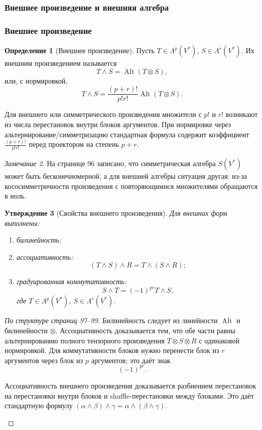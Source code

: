 \documentclass[12pt,a4paper]{article}
\theoremstyle{definition}
\newtheorem{definition}{Определение}[section]
\theoremstyle{plain}
\newtheorem{proposition}[definition]{Утверждение}
\theoremstyle{remark}
\newtheorem{remark}[definition]{Замечание}
\newenvironment{knowledgefix}{\begin{clarifybox}}{\end{clarifybox}}
\newcommand{\Alt}{\operatorname{Alt}}
\begin{document}
\subsubsection{Внешнее произведение и внешняя алгебра}

\subsubsection*{Внешнее произведение}

\begin{definition}[Внешнее произведение]
Пусть $T\in\Lambda^p(V^*)$, $S\in\Lambda^r(V^*)$. Их внешним произведением называется
\[
    T\wedge S=\Alt(T\otimes S),
\]
или, с нормировкой,
\[
    T\wedge S=\frac{(p+r)!}{p!r!}\Alt(T\otimes S).
\]
\begin{knowledgefix}
Для внешнего или симметрического произведения множители с \(p!\) и \(r!\) возникают из числа перестановок внутри блоков аргументов. При нормировке через альтернирование/симметризацию стандартная формула содержит коэффициент \(\frac{(p+r)!}{p!r!}\) перед проектором на степень \(p+r\).
\end{knowledgefix}
\end{definition}

\begin{remark}
На странице 96 записано, что симметрическая алгебра $S(V^*)$ может быть бесконечномерной, а для внешней алгебры ситуация другая: из-за кососимметричности произведения с повторяющимися множителями обращаются в ноль.
\end{remark}

\begin{proposition}[Свойства внешнего произведения]
Для внешних форм выполнены:
\begin{enumerate}[label=\arabic*)]
    \item билинейность;
    \item ассоциативность:
    \[
        (T\wedge S)\wedge R=T\wedge(S\wedge R);
    \]
    \item градуированная коммутативность:
    \[
        S\wedge T=(-1)^{pr}T\wedge S,
    \]
    где $T\in\Lambda^p(V^*)$, $S\in\Lambda^r(V^*)$.
\end{enumerate}
\end{proposition}

\begin{proof}[По структуре страниц 97--99]
Билинейность следует из линейности $\Alt$ и билинейности $\otimes$.
Ассоциативность доказывается тем, что обе части равны альтернированию полного тензорного произведения $T\otimes S\otimes R$ с одинаковой нормировкой.
Для коммутативности блоков нужно перенести блок из $r$ аргументов через блок из $p$ аргументов; это даёт знак
\[
    (-1)^{pr}.
\]
\begin{knowledgefix}
Ассоциативность внешнего произведения доказывается разбиением перестановок на перестановки внутри блоков и shuffle-перестановки между блоками. Это даёт стандартную формулу \((\alpha\wedge\beta)\wedge\gamma=\alpha\wedge(\beta\wedge\gamma)\).
\end{knowledgefix}
\end{proof}
\end{document}
